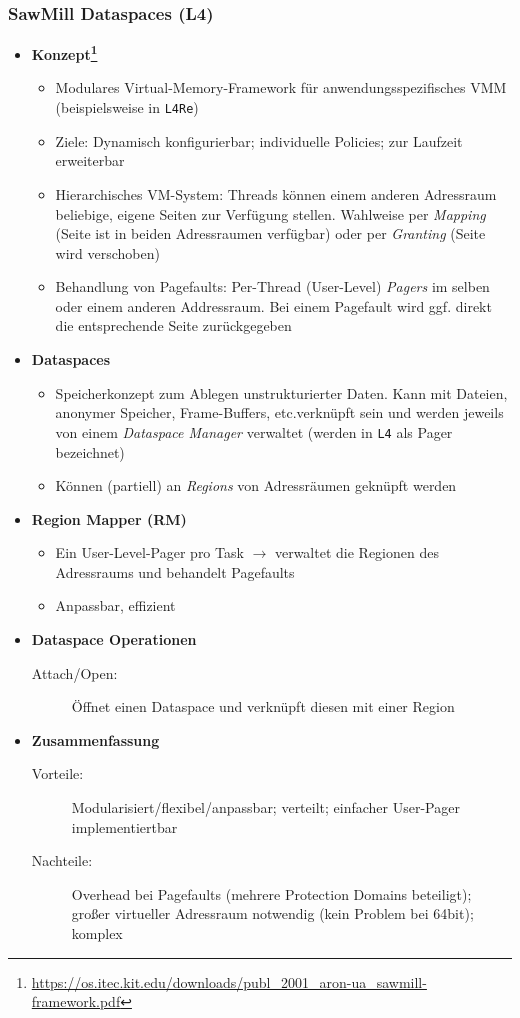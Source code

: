 \subsubsection{SawMill Dataspaces (L4)}
\begin{itemize}
	\item \textbf{Konzept\footnote{\url{https://os.itec.kit.edu/downloads/publ_2001_aron-ua_sawmill-framework.pdf}}}
	\begin{itemize}
		\item Modulares Virtual-Memory-Framework für anwendungsspezifisches VMM (beispielsweise in \texttt{L4Re})
		\item Ziele: Dynamisch konfigurierbar; individuelle Policies; zur Laufzeit erweiterbar
		\item Hierarchisches VM-System: Threads können einem anderen Adressraum beliebige, eigene Seiten zur Verfügung stellen. Wahlweise per \textit{Mapping} (Seite ist in beiden Adressraumen verfügbar) oder per \textit{Granting} (Seite wird verschoben)
		\item Behandlung von Pagefaults: Per-Thread (User-Level) \textit{Pagers} im selben oder einem anderen Addressraum. Bei einem Pagefault wird ggf. direkt die entsprechende Seite zurückgegeben
	\end{itemize}
	\item \textbf{Dataspaces}
	\begin{itemize}
		\item Speicherkonzept zum Ablegen unstrukturierter Daten. Kann mit Dateien, anonymer Speicher, Frame-Buffers, etc.verknüpft sein und werden jeweils von einem \textit{Dataspace Manager} verwaltet (werden in \texttt{L4} als Pager bezeichnet)
		\item Können (partiell) an \textit{Regions} von Adressräumen geknüpft werden
	\end{itemize}
	\item \textbf{Region Mapper (RM)}
	\begin{itemize}
		\item Ein User-Level-Pager pro Task \(\rightarrow\) verwaltet die Regionen des Adressraums und behandelt Pagefaults
		\item Anpassbar, effizient
	\end{itemize}
	\item \textbf{Dataspace Operationen}
	\begin{description}
		\item[Attach/Open:] Öffnet einen Dataspace und verknüpft diesen mit einer Region
	\end{description}
	\item \textbf{Zusammenfassung}
	\begin{description}
		\item[Vorteile:] Modularisiert/flexibel/anpassbar; verteilt; einfacher User-Pager implementiertbar
		\item[Nachteile:] Overhead bei Pagefaults (mehrere Protection Domains beteiligt); großer virtueller Adressraum notwendig (kein Problem bei 64bit); komplex
	\end{description}
\end{itemize}

